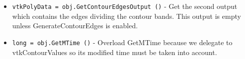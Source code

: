 \begin{itemize}
\item  \verb|vtkPolyData = obj.GetContourEdgesOutput ()| -  Get the second output which contains the edges dividing the contour 
 bands. This output is empty unless GenerateContourEdges is enabled.

\item  \verb|long = obj.GetMTime ()| -  Overload GetMTime because we delegate to vtkContourValues so its
 modified time must be taken into account.

\end{itemize}
